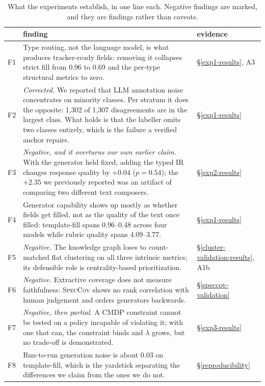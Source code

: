 \documentclass[sigconf, anonymous]{acmart}
\begin{document}
\begin{table}[t]\centering\footnotesize
\caption{What the experiments establish, in one line each. Negative findings are marked, and
they are findings rather than caveats.}\label{tab:findings}
\begin{tabular}{@{}p{0.6cm}p{7.6cm}p{2.4cm}@{}}\toprule
& finding & evidence \\\midrule
F1 & Type routing, not the language model, is what produces tracker-ready fields: removing it collapses strict fill from 0.96 to 0.69 and the per-type structural metrics to zero. & \S\ref{exp1-results}, A3 \\
F2 & \emph{Corrected.} We reported that LLM annotation noise concentrates on minority classes. Per stratum it does the opposite: 1{,}302 of 1{,}307 disagreements are in the largest class. What holds is that the labeller omits two classes entirely, which is the failure a verified anchor repairs. & \S\ref{exp1-results} \\
F3 & \emph{Negative, and it overturns our own earlier claim.} With the generator held fixed, adding the typed IR changes response quality by $+0.04$ ($p=0.54$); the $+2.35$ we previously reported was an artifact of comparing two different text composers. & \S\ref{exp2-results} \\
F4 & Generator capability shows up mostly as whether fields get filled, not as the quality of the text once filled: template-fill spans 0.96--0.48 across four models while rubric quality spans 4.09--3.77. & \S\ref{exp1-results} \\
F5 & \emph{Negative.} The knowledge graph loses to count-matched flat clustering on all three intrinsic metrics; its defensible role is centrality-based prioritization. & \S\ref{cluster-validation-results}, A1b \\
F6 & \emph{Negative.} Extractive coverage does not measure faithfulness: \textsc{SpecCov} shows no rank correlation with human judgement and orders generators backwards. & \S\ref{speccov-validation} \\
F7 & \emph{Negative, then partial.} A CMDP constraint cannot be tested on a policy incapable of violating it; with one that can, the constraint binds and $\lambda$ grows, but no trade-off is demonstrated. & \S\ref{exp3-results} \\
F8 & Run-to-run generation noise is about 0.03 on template-fill, which is the yardstick separating the differences we claim from the ones we do not. & \S\ref{reproducibility} \\
\bottomrule\end{tabular}\end{table}
\end{document}
